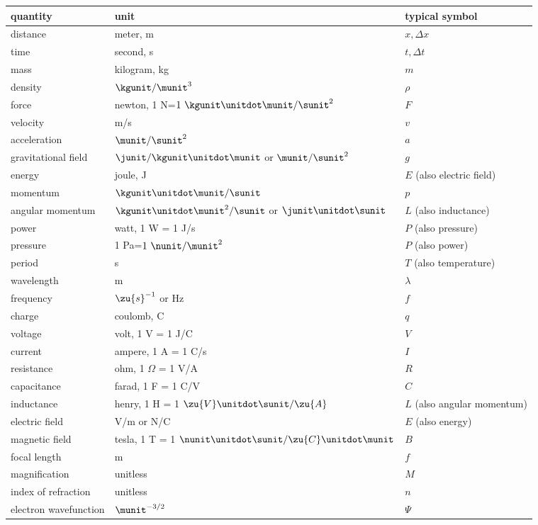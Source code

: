 \noindent\begin{tabular}{|l|l|l|}
\hline
quantity	& unit	& typical symbol \\
\hline
distance	& meter, m	& $x, \Delta{}x$ \\
time	& second, s	& $t, \Delta{}t$ \\
mass	& kilogram, kg	& $m$ \\
density	& $\kgunit/\munit^3$	& $\rho$  \\
force	& newton, 1 N=$1\ \kgunit\unitdot\munit/\sunit^2$	& $F$ \\
velocity	& m/s	& $v$ \\
acceleration	& $\munit/\sunit^2$	& $a$ \\
gravitational field	& $\junit/\kgunit\unitdot\munit$ or $\munit/\sunit^2$	& $g$ \\
energy	& joule, J	& $E$ (also electric field)\\
momentum	& $\kgunit\unitdot\munit/\sunit$	& $p$ \\
angular momentum	& $\kgunit\unitdot\munit^2/\sunit$ or $\junit\unitdot\sunit$	& $L$ (also inductance)\\
power	& watt, 1 W = 1 J/s	& $P$ (also pressure) \\
pressure & 1 Pa=$1\ \nunit/\munit^2$	& $P$ (also power)\\

period	& s	& $T$ (also temperature)\\
wavelength	& m	& $\lambda$ \\
frequency	& $\zu{s}^{-1}$ or Hz	& $f$ \\
charge	& coulomb, C	& $q$ \\
voltage	& volt, 1 V = 1 J/C	& $V$ \\
current	& ampere, 1 A = 1 C/s	& $I$ \\
resistance	& ohm, 1 $\Omega$ = 1 V/A	& $R$ \\
capacitance	& farad, 1 F = 1 C/V	& $C$ \\
inductance	& henry, 1 H = 1 $\zu{V}\unitdot\sunit/\zu{A}$	& $L$ (also angular momentum)\\
electric field	& V/m or N/C	& $E$ (also energy)\\
magnetic field	& tesla, 1 T = 1 $\nunit\unitdot\sunit/\zu{C}\unitdot\munit$	& $B$ \\
focal length	& m	& $f$ \\
magnification	& unitless	& $M$ \\
index of refraction	& unitless	& $n$ \\
electron wavefunction	& $\munit^{-3/2}$	& $\Psi$ \\
\hline
\end{tabular}
 
